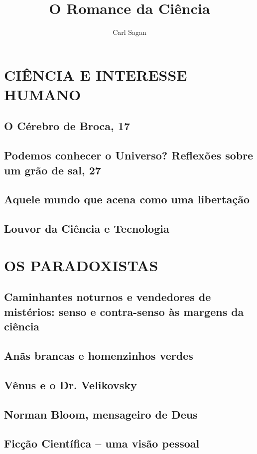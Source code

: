\documentclass[12pt]{memoir}
\title{O Romance da Ciência}
\author{Carl Sagan}
\date {}
\begin{document}
 
\tableofcontents 
\chapter {CIÊNCIA E INTERESSE HUMANO} 
\newpage
\section {O Cérebro de Broca, 17}
\newpage
\section {Podemos conhecer o Universo? Reflexões sobre um grão de sal, 27}
\newpage
\section {Aquele mundo que acena como uma libertação}
\newpage
\section {Louvor da Ciência e Tecnologia}\newpage
\chapter {OS PARADOXISTAS}
\newpage
\section {Caminhantes noturnos e vendedores de mistérios: senso e contra-senso às margens da ciência}
\newpage
\section {Anãs brancas e homenzinhos verdes}\newpage
\section {Vênus e o Dr. Velikovsky}
\newpage
\section {Norman Bloom, mensageiro de Deus}\newpage
\section {Ficção Científica -- uma visão pessoal}
\newpage
\end{document}
